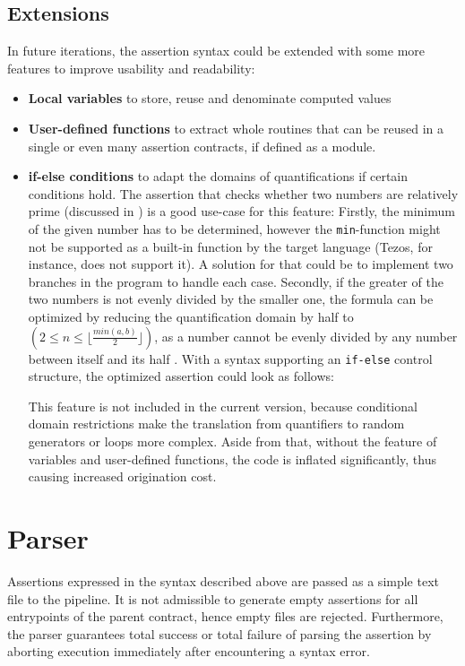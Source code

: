 \subsection{Extensions}\label{sec:ext}
In future iterations, the assertion syntax could be extended with some more features to improve usability and readability:
\begin{itemize}
\item \textbf{Local variables} to store, reuse and denominate computed values
\item \textbf{User-defined functions} to extract whole routines that can be reused in a single or even many assertion contracts, if defined as a module.
\item \textbf{if-else conditions} to adapt the domains of quantifications if certain conditions hold. The assertion that checks whether two numbers are relatively prime (discussed in ) is a good use-case for this feature: Firstly, the minimum of the given number has to be determined, however the \texttt{min}-function might not be supported as a built-in function by the target language (Tezos, for instance, does not support it). A solution for that could be to implement two branches in the program to handle each case. Secondly, if the greater of the two numbers is not evenly divided by the smaller one, the formula can be optimized by reducing the quantification domain by half to $(2 \le n \le \lfloor \frac{min(a,b)}{2} \rfloor)$, as a number cannot be evenly divided by any number between itself and its half \cite{bernhardt_veigel_2020}. With a syntax supporting an \texttt{if-else} control structure, the optimized assertion could look as follows:

This feature is not included in the current version, because conditional domain restrictions make the translation from quantifiers to random generators or loops more complex. Aside from that, without the feature of variables and user-defined functions, the code is inflated significantly, thus causing increased origination cost.
\end{itemize}

\section{Parser}
Assertions expressed in the syntax described above are passed as a simple text file to the pipeline. It is not admissible to generate empty assertions for all entrypoints of the parent contract, hence empty files are rejected. Furthermore, the parser guarantees total success or total failure of parsing the assertion by aborting execution immediately after encountering a syntax error. 


